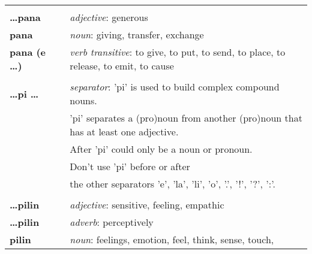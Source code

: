 \begin{supertabular}{p{2,5cm}|ll}
                                 &  &                                                                                                            \\
    \textbf{\dots pana}          &  & \textit{adjective}: generous                                                                               \\
    \textbf{pana}                &  & \textit{noun}: giving, transfer, exchange                                                                  \\
    \textbf{pana (e \dots)}      &  & \textit{verb transitive}: to give, to put, to send, to place, to release, to emit, to cause                \\
                                 &  &                                                                                                            \\
    \textbf{\dots pi \dots }     &  & \textit{separator}: 'pi' is used to build complex compound nouns.                                          \\
                                 &  & 'pi' separates a (pro)noun from another (pro)noun that has at least one adjective.                         \\
                                 &  & After 'pi' could only be a noun or pronoun.                                                                \\
                                 &  & Don't use 'pi' before or after                                                                             \\
                                 &  & the other separators 'e', 'la', 'li', 'o', '.', '!', '?', ':'.                                             \\
                                 &  &                                                                                                            \\
    \textbf{\dots pilin}         &  & \textit{adjective}: sensitive, feeling, empathic                                                           \\
    \textbf{\dots pilin}         &  & \textit{adverb}: perceptively                                                                              \\
    \textbf{pilin}               &  & \textit{noun}: feelings, emotion, feel, think, sense, touch,                                               \\

\end{supertabular}
